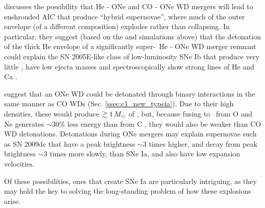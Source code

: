 \begin{itemize}

\cite{dan+14} discusses the possibility that He - ONe and CO - ONe WD mergers will lead to enshrouded AIC that produce ``hybrid supernovae'', where much of the outer envelope (of a different composition) explodes rather than collapsing.  In particular, they suggest (based on the \cite{shen+10he} and \cite{wald+11} simulations above) that the detonation of the thick He envelope of a significantly super-\Mch\ He - ONe WD merger remnant could  explain the SN 2005E-like class of low-luminosity SNe Ib that produce very little \Ni, have low ejecta masses and spectroscopically show strong lines of He and Ca \citep{pere+10}.

\cite{marq+15} suggest that an ONe WD could be detonated through binary interactions in the same manner as CO WDs (Sec. \ref{ssec:c1_new_typeia}).  Due to their high densities, these would produce $\gtrsim1\,\Msun$ of \Ni, but, because fusing to \Ni\ from O and Ne generates $\sim30$\% less energy than from C \citep{marq+15}, they would also be weaker than CO WD detonations.  Detonations during ONe mergers may explain supernovae such as SN 2009dc \citep{taub+09} that have a peak brightness $\sim3$ times higher, and decay from peak brightness $\sim3$ times more slowly, than SNe Ia, and also have low expansion velocities.

\end{itemize}

Of these possibilities, ones that create SNe Ia are particularly intriguing, as they may hold the key to solving the long-standing problem of how these explosions arise.
